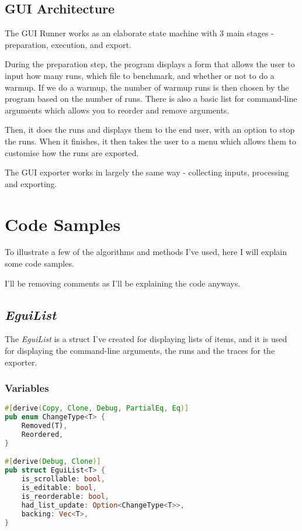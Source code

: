 \documentclass{article}
\begin{document}
\subsection{GUI Architecture}
The GUI Runner works as an elaborate state machine with 3 main stages - preparation, execution, and export.

During the preparation step, the program displays a form that allows the user to input how many runs, which file to benchmark, and whether or not to do a warmup. If we do a warmup, the number of warmup runs is then chosen by the program based on the number of runs. There is also a basic list for command-line arguments which allows you to reorder and remove arguments.

Then, it does the runs and displays them to the end user, with an option to stop the runs. When it finishes, it then takes the user to a menu which allows them to customise how the runs are exported.

The GUI exporter works in largely the same way - collecting inputs, processing and exporting.

\section{Code Samples}
To illustrate a few of the algorithms and methods I've used, here I will explain some code samples.

I'll be removing comments as I'll be explaining the code anyways.

\subsection{\textit{EguiList}}
The \textit{EguiList} is a struct I've created for displaying lists of items, and it is used for displaying the command-line arguments, the runs and the traces for the exporter.

\subsubsection{Variables}

\begin{lstlisting}[language=Rust]
#[derive(Copy, Clone, Debug, PartialEq, Eq)]
pub enum ChangeType<T> {
	Removed(T),
	Reordered,
}

#[derive(Debug, Clone)]
pub struct EguiList<T> {
	is_scrollable: bool,
	is_editable: bool,
	is_reorderable: bool,
	had_list_update: Option<ChangeType<T>>,
	backing: Vec<T>,
}
\end{lstlisting}
\end{document}
